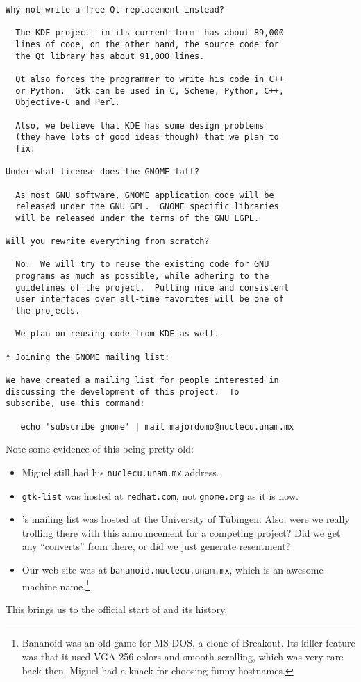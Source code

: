 \begin{lstlisting}[basicstyle=\footnotesize,
    frame=single,
    framerule=0pt,
    backgroundcolor=\color{lightgray},
    xleftmargin=0pt]
Why not write a free Qt replacement instead?

  The KDE project -in its current form- has about 89,000
  lines of code, on the other hand, the source code for
  the Qt library has about 91,000 lines.

  Qt also forces the programmer to write his code in C++
  or Python.  Gtk can be used in C, Scheme, Python, C++,
  Objective-C and Perl.

  Also, we believe that KDE has some design problems
  (they have lots of good ideas though) that we plan to
  fix.

Under what license does the GNOME fall?

  As most GNU software, GNOME application code will be
  released under the GNU GPL.  GNOME specific libraries
  will be released under the terms of the GNU LGPL.

Will you rewrite everything from scratch?

  No.  We will try to reuse the existing code for GNU
  programs as much as possible, while adhering to the
  guidelines of the project.  Putting nice and consistent
  user interfaces over all-time favorites will be one of
  the projects.

  We plan on reusing code from KDE as well.

* Joining the GNOME mailing list:

We have created a mailing list for people interested in
discussing the development of this project.  To
subscribe, use this command:

   echo 'subscribe gnome' | mail majordomo@nuclecu.unam.mx
\end{lstlisting}

Note some evidence of this being pretty old:

\begin{itemize}

\item{Miguel still had his {\tt nuclecu.unam.mx} address.}

\item{{\tt gtk-list} was hosted at {\tt redhat.com}, not
  {\tt gnome.org} as it is now.}

\item{\KDE's mailing list was hosted at the University of
  Tübingen.  Also, were we really trolling there with
  this announcement for a competing project?  Did we get
  any ``converts'' from there, or did we just generate
  resentment?}

\item{Our web site was at {\tt bananoid.nuclecu.unam.mx},
  which is an awesome machine name.\footnote{Bananoid was
    an old game for MS-DOS, a clone of Breakout.  Its
    killer feature was that it used VGA 256 colors and
    smooth scrolling, which was very rare back then.
    Miguel had a knack for choosing funny hostnames.}}

\end{itemize}

This brings us to the official start of \GNOME and its
history.
